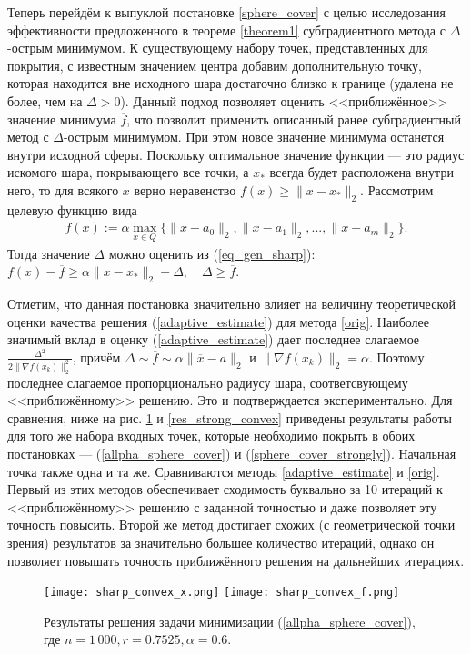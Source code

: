 Теперь перейдём к выпуклой постановке \eqref{sphere_cover} с целью исследования эффективности предложенного в теореме \ref{theorem1} субградиентного метода с $\Delta$-острым минимумом. К существующему набору точек, представленных для покрытия, с известным значением центра добавим дополнительную точку, которая находится вне исходного шара достаточно близко к границе (удалена не более, чем на $\Delta > 0$). Данный подход позволяет оценить <<приближённое>> значение минимума $\overline{f}$, что позволит применить описанный ранее субградиентный метод с $\Delta$-острым минимумом. При этом новое значение минимума останется внутри исходной сферы. Поскольку оптимальное значение функции --- это радиус искомого шара, покрывающего все точки, а $x_*$ всегда будет расположена внутри него, то для всякого $x$ верно неравенство $ f(x) \geq \| x - x_*\|_2$. Рассмотрим целевую функцию вида
\begin{gather}\label{allpha_sphere_cover}
    f(x) := \alpha \max_{x\in Q}\{\|x - a_0\|_2, \|x - a_1\|_2, ..., \|x - a_m\|_2\}.
\end{gather}
Тогда значение $\Delta$ можно оценить  из (\ref{eq_gen_sharp}): 
    $f(x) - \overline{f} \geq \alpha\|x- x_*\|_2 - \Delta, \quad \Delta \geq \overline{f}$.

Отметим, что данная постановка значительно влияет на величину теоретической оценки качества решения (\ref{adaptive_estimate}) для метода \eqref{orig}.
Наиболее значимый вклад в оценку (\ref{adaptive_estimate}) дает последнее слагаемое $\frac{\Delta^2}{2\|\nabla f(x_k)\|^2_2}$, причём 
$     \Delta \sim \overline{f} \sim \alpha \|\overline{x}-a\|_2 $ и 
$     \|\nabla f(x_k)\|_2 = \alpha $. Поэтому последнее слагаемое пропорционально радиусу шара, соответсвующему <<приближённому>> решению. Это и подтверждается экспериментально. Для сравнения, ниже на рис. \ref{res_sharp_convex} и \ref{res_strong_convex} приведены результаты работы для того же набора входных точек, которые необходимо покрыть в обоих постановках --- (\ref{allpha_sphere_cover}) и (\ref{sphere_cover_strongly}). Начальная точка также одна и та же. Сравниваются методы \eqref{adaptive_estimate} и \eqref{orig}. Первый из этих методов обеспечивает сходимость буквально за 10 итераций к <<приближённому>> решению с заданной точностью и даже позволяет эту точность повысить. Второй же метод достигает схожих (с геометрической точки зрения) результатов за значительно большее количество итераций, однако он позволяет повышать точность приближённого решения на дальнейших итерациях.

\begin{figure}[h]
    \texttt{[image: sharp\_convex\_x.png]}
    \endminipage\hfill
    \texttt{[image: sharp\_convex\_f.png]}
    \endminipage\hfill
    \caption{ Результаты решения задачи минимизации (\ref{allpha_sphere_cover}), где  $n= 1\,000, r = 0.7525, \alpha = 0.6$.}
    \label{res_sharp_convex}
\end{figure}

